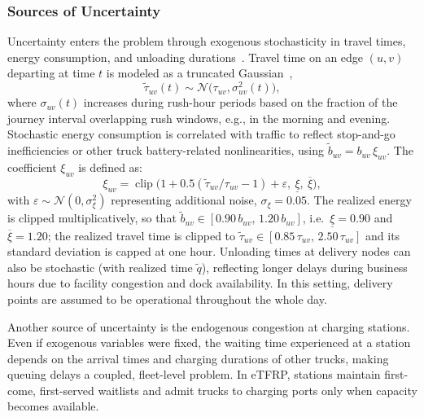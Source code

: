 \documentclass[journal]{IEEEtran}
\begin{document}
\subsubsection{Sources of Uncertainty}
\label{sec:unc}

Uncertainty enters the problem through exogenous stochasticity in travel times, energy consumption, and unloading durations~\cite{lombard2018modelling}. Travel time on an edge $(u,v)$ departing at time $t$ is modeled as a truncated Gaussian~\cite{RODRIGUES2018636},
\begin{equation}
\tilde{\tau}_{uv}(t) \sim \mathcal{N}\!\big(\tau_{uv},\sigma_{uv}^2(t)\big),
\label{eq:unc_travel}
\end{equation}
where $\sigma_{uv}(t)$ increases during rush-hour periods based on the fraction of the journey interval overlapping rush windows, e.g., in the morning and evening.
Stochastic energy consumption is correlated with traffic to reflect stop-and-go inefficiencies or other truck battery-related nonlinearities, using $\tilde{b}_{uv} = b_{uv}\,\xi_{uv}$. The coefficient $\xi_{uv}$ is defined as:
\begin{equation}
\xi_{uv} =
\operatorname{clip}\!\Big(
1 + 0.5(\tilde{\tau}_{uv}/\tau_{uv}-1) + \varepsilon,\ \underline{\xi},\ \overline{\xi}
\Big),
\label{eq:unc_energy}
\end{equation}
with $\varepsilon\sim\mathcal{N}(0,\sigma_\xi^2)$ representing additional noise, $\sigma_\xi=0.05$. The realized energy is clipped multiplicatively, so that $\tilde{b}_{uv}\in[0.90\,b_{uv},\,1.20\,b_{uv}]$, i.e.\ $\underline{\xi}=0.90$ and $\overline{\xi}=1.20$; the realized travel time is clipped to $\tilde{\tau}_{uv}\in[0.85\,\tau_{uv},\,2.50\,\tau_{uv}]$ and its standard deviation is capped at one hour.
Unloading times at delivery nodes can also be stochastic (with realized time $\tilde{q}$), reflecting longer delays during business hours due to facility congestion and dock availability. In this setting, delivery points are assumed to be operational throughout the whole day.

Another source of uncertainty is the endogenous congestion at charging stations. Even if exogenous variables were fixed, the waiting time experienced at a station depends on the arrival times and charging durations of other trucks, making queuing delays a coupled, fleet-level problem. In eTFRP, stations maintain first-come, first-served waitlists and admit trucks to charging ports only when capacity becomes available.
\end{document}
